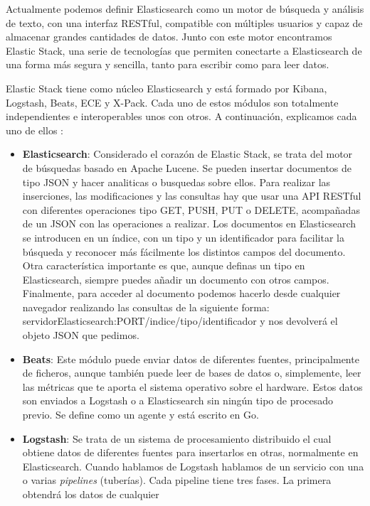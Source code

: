 Actualmente podemos definir Elasticsearch como un motor de búsqueda y
análisis de texto, con una interfaz RESTful, compatible con múltiples
usuarios y capaz de almacenar grandes cantidades de datos. Junto con este
motor encontramos Elastic Stack, una serie de tecnologías que permiten
conectarte a Elasticsearch de una forma más segura y sencilla, tanto para
escribir como para leer datos.

Elastic Stack tiene como núcleo Elasticsearch y está formado por Kibana,
Logstash, Beats, ECE y X-Pack. Cada uno de estos módulos son totalmente
independientes e interoperables unos con otros. A continuación, explicamos
cada uno de ellos \cite{Elk-4}:

\begin{itemize}
\item \textbf{Elasticsearch}: Considerado el corazón de Elastic Stack, se
  trata del motor de búsquedas basado en Apache Lucene. Se pueden insertar
  documentos de tipo JSON y hacer analiticas o busquedas sobre ellos. Para
  realizar las inserciones, las modificaciones y las consultas hay que usar
  una API RESTful con diferentes operaciones tipo GET, PUSH, PUT o DELETE,
  acompañadas de un JSON con las operaciones a realizar. Los documentos en
  Elasticsearch se introducen en un índice, con un tipo y un identificador
  para facilitar la búsqueda y reconocer más fácilmente los distintos
  campos del documento. Otra característica importante es que, aunque
  definas un tipo en Elasticsearch, siempre puedes añadir un documento con
  otros campos. Finalmente, para acceder al documento podemos hacerlo desde
  cualquier navegador realizando las consultas de la siguiente forma:
  servidorElasticsearch:PORT/indice/tipo/identificador y nos devolverá el
  objeto JSON que pedimos.
\item \textbf{Beats}: Este módulo puede enviar datos de diferentes fuentes,
  principalmente de ficheros, aunque también puede leer de bases de datos
  o, simplemente, leer las métricas que te aporta el sistema operativo
  sobre el hardware. Estos datos son enviados a Logstash o a Elasticsearch
  sin ningún tipo de procesado previo. Se define como un agente y está
  escrito en Go.
\item \textbf{Logstash}: Se trata de un sistema de procesamiento
  distribuido el cual obtiene datos de diferentes fuentes para insertarlos
  en otras, normalmente en Elasticsearch. Cuando hablamos de Logstash
  hablamos de un servicio con una o varias \emph{pipelines} (tuberías). Cada
  pipeline tiene tres fases. La primera obtendrá los datos de cualquier

\end{itemize}
